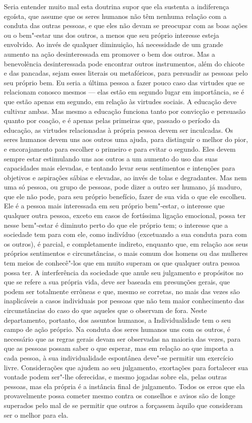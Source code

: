 Seria entender muito mal esta doutrina supor que ela sustenta a
indiferença egoísta, que assume que os seres humanos não têm nenhuma
relação com a conduta das outras pessoas, e que eles não devam se
preocupar com as boas ações ou o bem"-estar uns dos outros, a menos que
seu próprio interesse esteja envolvido. Ao invés de qualquer
diminuição, há necessidade de um grande aumento na ação desinteressada
em promover o bem dos outros. Mas a benevolência desinteressada pode
encontrar outros instrumentos, além do chicote e das pancadas, sejam
esses literais ou metafóricos, para persuadir as pessoas pelo seu
próprio bem. Eu seria a última pessoa a fazer pouco caso das
virtudes que se relacionam conosco mesmos --- elas estão em segundo lugar
em importância, se é que estão apenas em segundo, em relação às
virtudes sociais. A educação deve cultivar ambas. Mas mesmo a educação
funciona tanto por convicção e persuasão quanto por coação, e é
apenas pelas primeiras que, passado o período da educação, as virtudes
relacionadas à própria pessoa devem ser inculcadas. Os seres humanos
devem uns aos outros uma ajuda, para distinguir o melhor do pior, e
encorajamento para escolher o primeiro e para evitar o segundo. Eles
devem sempre estar estimulando uns aos outros a um aumento do uso das
suas capacidades mais elevadas, e tentando levar seus sentimentos e
intenções para objetivos e aspirações sábias e elevadas, ao invés de
tolas e degradantes. Mas nem uma só pessoa, ou grupo de pessoas, pode
dizer a outro ser humano, já maduro, que ele não pode, para seu próprio
benefício, fazer de sua vida o que ele escolheu. Ele é
a pessoa mais interessada em seu próprio bem"-estar, o interesse que
qualquer outra pessoa, exceto em casos de fortíssima ligação emocional,
possa ter nesse bem"-estar é diminuto perto do que ele próprio tem; o
interesse que a sociedade tem para com ele, como indivíduo (excetuando
a sua conduta para com os outros), é parcial, e completamente indireto,
enquanto que, em relação aos seus próprios sentimentos e
circunstâncias, o mais comum dos homens ou das mulheres tem meios de
conhecê"-los que em muito superam os que qualquer outra pessoa possa
ter. A interferência da sociedade que anule seu julgamento e propósitos
no que se refere a sua própria vida, deve ser baseada em presunções
gerais, que podem ser totalmente errôneas e que, mesmo se corretas, no
mais das vezes são inaplicáveis a casos individuais por pessoas que não
tem maior conhecimento das circunstâncias do caso do que aqueles que o
observam de fora. Neste departamento, portanto, dos assuntos humanos, a
Individualidade tem o seu campo de ação próprio. Na conduta dos seres
humanos uns com os outros, é necessário que as regras gerais devam ser
observadas na maioria das vezes, para que as pessoas possam saber o que
esperar, mas em relação ao que importa a cada pessoa, à sua
individualidade espontânea deve"-se permitir um exercício livre.
Considerações que ajudem ao seu julgamento, exortações para fortalecer
sua vontade podem ser"-lhe oferecidas, e mesmo jogadas sobre ela, pelas
outras pessoas, mas ela própria é a instância final de julgamento.
Todos os erros que ela provavelmente possa cometer mesmo contra os
conselhos e avisos são de longe superados pelo mal de se permitir que
outros a forçassem àquilo que consideram ser o melhor para ela. 

